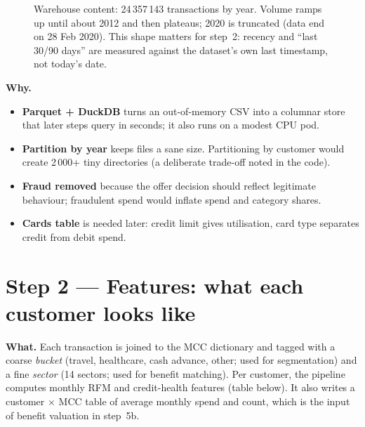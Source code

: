 \documentclass[11pt,a4paper]{article}
\newcommand{\why}[1]{\par\needspace{6\baselineskip}\smallskip\noindent\textbf{\textcolor{ca}{Why.}} #1\par}
\begin{document}
\begin{figure}[h]
\centering
{}
\caption{Warehouse content: 24\,357\,143 transactions by year. Volume ramps up until about 2012 and then
plateaus; 2020 is truncated (data end on 28 Feb 2020). This shape matters for step~2: recency and ``last
30/90 days'' are measured against the dataset's own last timestamp, not today's date.}
\end{figure}

\why{
\begin{itemize}
\item \textbf{Parquet + DuckDB} turns an out-of-memory CSV into a columnar store that later steps query in seconds; it also runs on a modest CPU pod.
\item \textbf{Partition by year} keeps files a sane size. Partitioning by customer would create 2\,000+ tiny directories (a deliberate trade-off noted in the code).
\item \textbf{Fraud removed} because the offer decision should reflect legitimate behaviour; fraudulent spend would inflate spend and category shares.
\item \textbf{Cards table} is needed later: credit limit gives utilisation, card type separates credit from debit spend.
\end{itemize}}

\section{Step 2 --- Features: what each customer looks like}

\textbf{What.} Each transaction is joined to the MCC dictionary and tagged with a coarse \emph{bucket}
(travel, healthcare, cash advance, other; used for segmentation) and a fine \emph{sector} (14 sectors;
used for benefit matching). Per customer, the pipeline computes monthly RFM and credit-health features
(table below). It also writes a customer $\times$ MCC table of average monthly spend and count, which is the
input of benefit valuation in step~5b.
\end{document}
